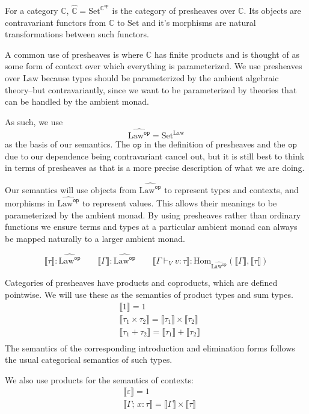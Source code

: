 \documentclass[acmsmall, screen, review, anonymous]{acmart}
\theoremstyle{definition}
\newcommand{\cat}{\mathbb{C}}
\newcommand{\op}{\mathtt{op}}
\newcommand{\catop}{\cat^{\op}}
\newcommand{\setc}{\mathrm{Set}}
\newcommand{\psh}{\widehat{\cat}}
\newcommand{\lawc}{\mathrm{Law}}
\newcommand{\lawcop}{\lawc^{\mathtt{op}}}
\newcommand{\pshlawcop}{\widehat{\lawcop}}
\newcommand{\homset}[3]{\mathrm{Hom}_{#1}(#2, #3)}
\newcommand{\sem}[1]{\llbracket #1 \rrbracket}
\newcommand{\types}{\mathrel{:}}
\newcommand{\cempty}{\varepsilon}
\newcommand{\ccons}[2]{#1;\,#2}
\newcommand{\lbind}[3]{\ccons{#1}{#2\types#3}}
\newcommand{\turnv}{\mathrel{\vdash_V}}
\begin{document}
For a category $\cat$, $\psh = \setc^{\catop}$ is the category of
presheaves over $\cat$. Its objects are contravariant functors from
$\cat$ to $\setc$ and it's morphisms are natural transformations between
such functors.

A common use of presheaves is where $\cat$ has finite products and is
thought of as some form of context over which everything is
parameterized. We use presheaves over $\lawc$ because types should be
parameterized by the ambient algebraic theory--but contravariantly,
since we want to be parameterized by theories that can be handled by the
ambient monad.

As such, we use
\begin{equation*}
  \pshlawcop = \setc^{\lawc}
\end{equation*}
as the basis of our semantics. The $\op$ in the definition of presheaves
and the $\op$ due to our dependence being contravariant cancel out, but
it is still best to think in terms of presheaves as that is a more
precise description of what we are doing.

Our semantics will use objects from $\pshlawcop$ to represent types and
contexts, and morphisms in $\pshlawcop$ to represent values. This allows
their meanings to be parameterized by the ambient monad. By using
presheaves rather than ordinary functions we ensure terms and types at a
particular ambient monad can always be mapped naturally to a larger
ambient monad.

\begin{equation*}
\sem{\tau} \mathrel{:} \pshlawcop \qquad
\sem{\Gamma} \mathrel{:} \pshlawcop \qquad
\sem{\Gamma \turnv v \types \tau} \mathrel{:} \homset{\pshlawcop}{\sem{\Gamma}}{\sem{\tau}}
\end{equation*}

Categories of presheaves have products and coproducts, which are defined
pointwise. We will use these as the semantics of product types and sum
types.
\begin{align*}
&\sem{1} = 1 \\
&\sem{\tau_1 \times \tau_2} = \sem{\tau_1} \times \sem{\tau_2} \\
&\sem{\tau_1 + \tau_2} = \sem{\tau_1} + \sem{\tau_2} \\
\end{align*}
The semantics of the corresponding introduction and elimination forms
follows the usual categorical semantics of such types.

We also use products for the semantics of contexts:
\begin{align*}
&\sem{\cempty} = 1 \\
&\sem{\lbind{\Gamma}{x}{\tau}} = \sem{\Gamma} \times \sem{\tau} \\
\end{align*}
\end{document}
